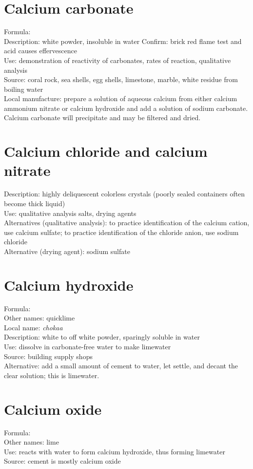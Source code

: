 \section{Calcium carbonate}
Formula: \\
Description: white powder, 
insoluble in water
Confirm: brick red flame test and acid causes effervescence\\
Use: demonstration of reactivity of carbonates, 
rates of reaction, 
qualitative analysis\\
Source: coral rock, 
sea shells, 
egg shells, 
limestone, 
marble, 
white residue from boiling water\\
Local manufacture: prepare a solution of aqueous calcium 
from either calcium ammonium nitrate or calcium hydroxide 
and add a solution of sodium carbonate.\\ 
Calcium carbonate will precipitate and may be filtered and dried.

\section{Calcium chloride and calcium nitrate}
Description: highly deliquescent colorless crystals 
(poorly sealed containers often become thick liquid)\\
Use: qualitative analysis salts, 
drying agents\\
Alternatives (qualitative analysis): 
to practice identification of the calcium cation, 
use calcium sulfate; 
to practice identification of the chloride anion, 
use sodium chloride\\
Alternative (drying agent): sodium sulfate

\section{Calcium hydroxide}
Formula: \\
Other names: quicklime\\
Local name: \textit{chokaa}\\
Description: white to off white powder, 
sparingly soluble in water\\
Use: dissolve in carbonate-free water to make limewater\\
Source: building supply shops\\
Alternative: add a small amount of cement to water, 
let settle, 
and decant the clear solution; 
this is limewater.

\section{Calcium oxide}
Formula: \\
Other names: lime\\
Use: reacts with water to form calcium hydroxide, 
thus forming limewater\\
Source: cement is mostly calcium oxide


